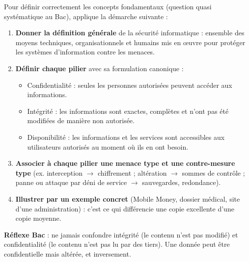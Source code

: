 \documentclass[11pt]{article}
\newcommand{\cle}[1]{{\popxbold\color{popdark}#1}}
\begin{document}
\begin{methode}
Pour définir correctement les concepts fondamentaux (question quasi systématique au Bac), applique la démarche suivante :
\begin{enumerate}
  \item \textbf{Donner la définition générale} de la sécurité informatique : ensemble des moyens techniques, organisationnels et humains mis en œuvre pour protéger les systèmes d'information contre les menaces.
  \item \textbf{Définir chaque pilier} avec sa formulation canonique :
  \begin{itemize}
    \item \cle{Confidentialité} : seules les personnes autorisées peuvent accéder aux informations.
    \item \cle{Intégrité} : les informations sont exactes, complètes et n'ont pas été modifiées de manière non autorisée.
    \item \cle{Disponibilité} : les informations et les services sont accessibles aux utilisateurs autorisés au moment où ils en ont besoin.
  \end{itemize}
  \item \textbf{Associer à chaque pilier une menace type et une contre-mesure type} (ex. interception $\to$ chiffrement ; altération $\to$ sommes de contrôle ; panne ou attaque par déni de service $\to$ sauvegardes, redondance).
  \item \textbf{Illustrer par un exemple concret} (Mobile Money, dossier médical, site d'une administration) : c'est ce qui différencie une copie excellente d'une copie moyenne.
\end{enumerate}
\textbf{Réflexe Bac} : ne jamais confondre intégrité (le contenu n'est pas modifié) et confidentialité (le contenu n'est pas lu par des tiers). Une donnée peut être confidentielle mais altérée, et inversement.
\end{methode}
\end{document}
